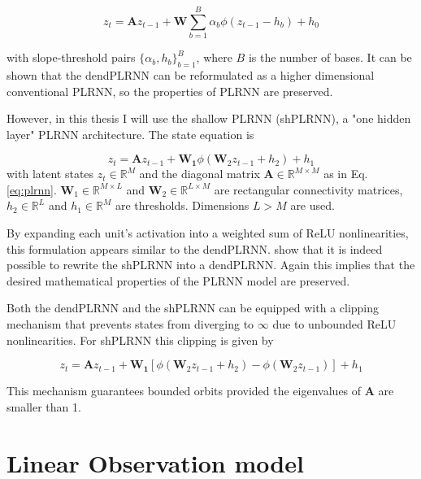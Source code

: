 \begin{equation}
    z_t = \boldsymbol{A} z_{t-1} + \boldsymbol{W} \sum_{b=1}^{B} \alpha_b \phi(z_{t-1} - h_b) + h_0
    \label{eq:dendPLRNN}
\end{equation}

with slope-threshold pairs $\{ \alpha_b, h_b \}_{b=1}^B$, where $B$ is the number of bases. It can be shown that the dendPLRNN can be reformulated as a higher dimensional
conventional PLRNN, so the properties of PLRNN are preserved.

However, in this thesis I will use the shallow PLRNN (shPLRNN), a "one hidden layer" PLRNN architecture. The state equation is 

\begin{equation}
    z_{t} = \boldsymbol{A} z_{t-1} + \boldsymbol{W_1} \phi \left( \boldsymbol{W}_2 z_{t-1} + h_2 \right) + h_1
    \label{eq:shPLRNN}
\end{equation}
with latent states $z_t \in \mathbb{R}^M$ and the diagonal matrix $\boldsymbol{A} \in \mathbb{R}^{M \times M}$ as in Eq. \ref{eq:plrnn}. 
$\boldsymbol{W}_1 \in \mathbb{R}^{M \times L}$ and $\boldsymbol{W}_2 \in \mathbb{R}^{L \times M}$ are rectangular connectivity matrices, 
$h_2 \in \mathbb{R}^L$ and $h_1 \in \mathbb{R}^M$ are thresholds. Dimensions $L > M$ are used. 

By expanding each unit's activation into a weighted sum of ReLU nonlinearities, this formulation appears similar to the dendPLRNN. \cite{hess2023generalized} show that it is 
indeed possible to rewrite the shPLRNN into a dendPLRNN. Again this implies that the desired mathematical properties of the PLRNN model are preserved.

Both the dendPLRNN and the shPLRNN can be equipped with a clipping mechanism that prevents states from diverging to $\infty$ due to unbounded ReLU nonlinearities.
For shPLRNN this clipping is given by

\begin{equation}
    z_{t} = \boldsymbol{A} z_{t-1} + \boldsymbol{W_1} \left[\phi \left( \boldsymbol{W}_2 z_{t-1} + h_2 \right) - \phi \left( \boldsymbol{W}_2 z_{t-1}\right) \right]+ h_1 
    \label{eq:clippedShPLRNN}
\end{equation}

This mechanism guarantees bounded orbits provided the eigenvalues of $\boldsymbol{A}$ are smaller than 1.

\section{Linear Observation model}

